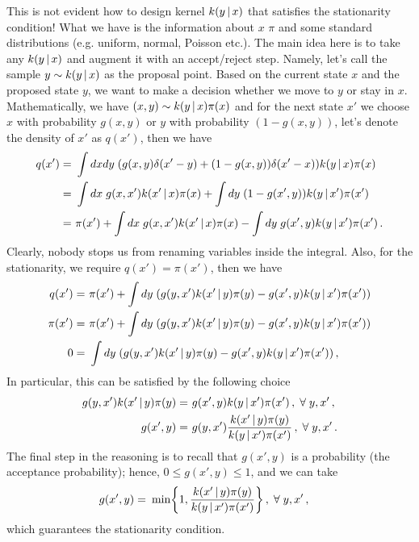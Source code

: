 This is not evident how to design kernel $k(y\,|\, x)$ that satisfies the stationarity condition! What we have is the information about $x$ $\pi$ and some standard distributions (e.g. uniform, normal, Poisson etc.). The main idea here is to take any $k(y\,|\, x)$ and augment it with an accept/reject step. Namely, let's call the sample $y \sim k(y\,|\, x)$ as the proposal point. Based on the current state $x$ and the proposed state $y$, we want to make a decision whether we move to $y$ or stay in $x$. Mathematically, we have $(x,y) \sim k(y\,|\, x)\pi(x)$ and for the next state $x'$ we choose $x$ with probability $g(x,y)$ or $y$ with probability $(1-g(x,y))$, let's denote the density of $x'$ as $q(x')$, then we have
\begin{align}
    q(x') =~& \int dxdy\; (g(x,y)\delta(x'-y) + (1-g(x,y))\delta(x'-x))k(y\,|\, x)\pi(x) \label{eq:mh_kernel}\\
    =~& \int dx\; g(x,x')k(x'\,|\, x)\pi(x) + \int dy\; (1-g(x',y))k(y\,|\, x')\pi(x') \\
    =~& \pi(x') + \int dx\; g(x,x')k(x'\,|\, x)\pi(x) - \int dy\; g(x',y)k(y\,|\, x')\pi(x')\,.
\end{align}
Clearly, nobody stops us from renaming variables inside the integral. Also, for the stationarity, we require $q(x') = \pi(x')$, then we have
\begin{align}
    q(x') =~& \pi(x') + \int dy\; \left(g(y,x')k(x'\cond y)\pi(y) - g(x',y)k(y\cond x')\pi(x')\right)\\
    \pi(x') =~& \pi(x') + \int dy\; \left(g(y,x')k(x'\cond y)\pi(y) - g(x',y)k(y\cond x')\pi(x')\right)\\
    0 =~& \int dy\; \left(g(y,x')k(x'\cond y)\pi(y) - g(x',y)k(y\cond x')\pi(x')\right)\,,
\end{align}
In particular, this can be satisfied by the following choice
\begin{align}
    g(y,x')k(x'\,|\, y)\pi(y) =~& g(x',y)k(y\,|\, x')\pi(x')\,,\;\forall\; y,x'\,,\\
    g(x',y) =~& g(y,x')\frac{k(x'\,|\, y)\pi(y)}{k(y\,|\, x')\pi(x')}\,,\;\forall\; y,x'\,.
\end{align}
The final step in the reasoning is to recall that $g(x',y)$ is a probability (the acceptance probability); hence, $0 \leq g(x',y) \leq 1$, and we can take
\begin{align}
    g(x',y) =~& \min\left\{1,\frac{k(x'\cond y)\pi(y)}{k(y\cond x')\pi(x')}\right\}\,,\;\forall\; y,x'\,,
    \label{eq:mh_acceptance}
\end{align}
which guarantees the stationarity condition.

